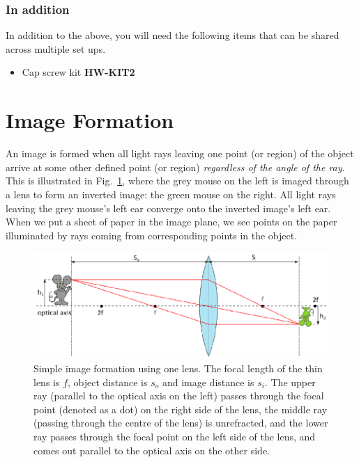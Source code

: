 \documentclass[a4paper]{report}
\begin{document}
\subsubsection{In addition}
In addition to the above, you will need the following items that can be shared across multiple set ups.
\begin{itemize}
\item Cap screw kit \textbf{HW-KIT2}
\end{itemize}


\clearpage

\section{Image Formation}
An image is formed when all light rays leaving one point (or region) of the object arrive at some other defined point (or region) \textit{regardless of the angle of the ray}. 
This is illustrated in Fig.~\ref{fig:imageforming}, where the grey mouse on the left is imaged through a lens to form an inverted image: the green mouse on the right. 
All light rays leaving the grey mouse's left ear converge onto the inverted image's left ear. 
When we put a sheet of paper in the image plane, we see points on the paper illuminated by rays coming from corresponding points in the object. 



\begin{figure}[h]
\center
\includegraphics{image_forming_basics.eps}
\caption{Simple image formation using one lens. 
The focal length of the thin lens is $f$, object distance is $s_o$ and image distance is $s_i$. 
The upper ray (parallel to the optical axis on the left) passes through the focal point (denoted as a dot) on the right side of the lens, the middle ray (passing through the centre of the lens) is unrefracted, and the lower ray passes through the focal point on the left side of the lens, and comes out parallel to the optical axis on the other side. 
}
\label{fig:imageforming}
\end{figure}
\end{document}
